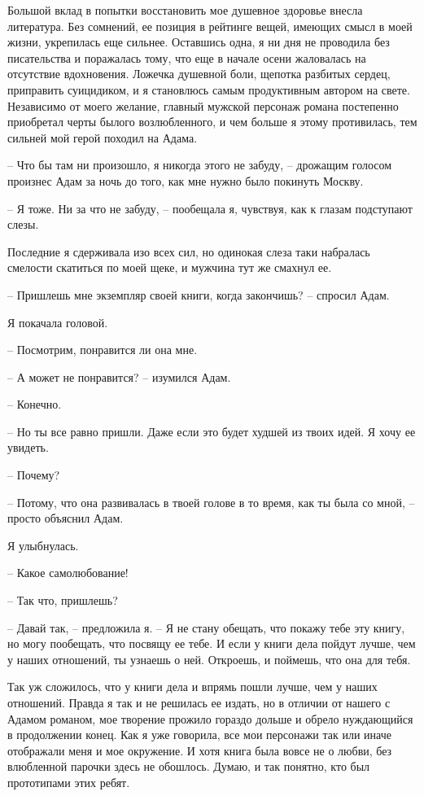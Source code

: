 \documentclass[
]{book}
\begin{document}
Большой вклад в попытки восстановить мое душевное здоровье внесла литература. Без сомнений, ее позиция в рейтинге вещей, имеющих смысл в моей жизни, укрепилась еще сильнее. Оставшись одна, я ни дня не проводила без писательства и поражалась тому, что еще в начале осени жаловалась на отсутствие вдохновения. Ложечка душевной боли, щепотка разбитых сердец, приправить суицидиком, и я становлюсь самым продуктивным автором на свете. Независимо от моего желание, главный мужской персонаж романа постепенно приобретал черты былого возлюбленного, и чем больше я этому противилась, тем сильней мой герой походил на Адама.

-- Что бы там ни произошло, я никогда этого не забуду, -- дрожащим голосом произнес Адам за ночь до того, как мне нужно было покинуть Москву.

-- Я тоже. Ни за что не забуду, -- пообещала я, чувствуя, как к глазам подступают слезы.

Последние я сдерживала изо всех сил, но одинокая слеза таки набралась смелости скатиться по моей щеке, и мужчина тут же смахнул ее.

-- Пришлешь мне экземпляр своей книги, когда закончишь? -- спросил Адам.

Я покачала головой.

-- Посмотрим, понравится ли она мне.

-- А может не понравится? -- изумился Адам.

-- Конечно.

-- Но ты все равно пришли. Даже если это будет худшей из твоих идей. Я хочу ее увидеть.

-- Почему?

-- Потому, что она развивалась в твоей голове в то время, как ты была со мной, -- просто объяснил Адам.

Я улыбнулась.

-- Какое самолюбование!

-- Так что, пришлешь?

-- Давай так, -- предложила я. -- Я не стану обещать, что покажу тебе эту книгу, но могу пообещать, что посвящу ее тебе. И если у книги дела пойдут лучше, чем у наших отношений, ты узнаешь о ней. Откроешь, и поймешь, что она для тебя.

Так уж сложилось, что у книги дела и впрямь пошли лучше, чем у наших отношений. Правда я так и не решилась ее издать, но в отличии от нашего с Адамом романом, мое творение прожило гораздо дольше и обрело нуждающийся в продолжении конец. Как я уже говорила, все мои персонажи так или иначе отображали меня и мое окружение. И хотя книга была вовсе не о любви, без влюбленной парочки здесь не обошлось. Думаю, и так понятно, кто был прототипами этих ребят.
\end{document}
